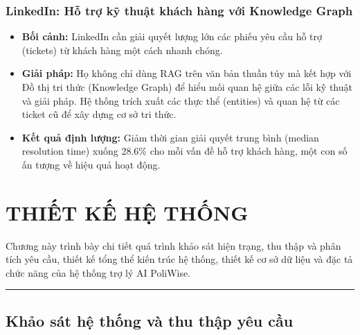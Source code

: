 \documentclass[12pt,a4paper]{report}
\begin{document}
\subsection{LinkedIn: Hỗ trợ kỹ thuật khách hàng với Knowledge Graph}
\begin{itemize}
    \item \textbf{Bối cảnh:} LinkedIn cần giải quyết lượng lớn các phiếu yêu cầu hỗ trợ (tickets) từ khách hàng một cách nhanh chóng.
    \item \textbf{Giải pháp:} Họ không chỉ dùng RAG trên văn bản thuần túy mà kết hợp với Đồ thị tri thức (Knowledge Graph) để hiểu mối quan hệ giữa các lỗi kỹ thuật và giải pháp. Hệ thống trích xuất các thực thể (entities) và quan hệ từ các ticket cũ để xây dựng cơ sở tri thức.
    \item \textbf{Kết quả định lượng:} Giảm thời gian giải quyết trung bình (median resolution time) xuống 28.6\% cho mỗi vấn đề hỗ trợ khách hàng, một con số ấn tượng về hiệu quả hoạt động.
\end{itemize}

\clearpage

\chapter{THIẾT KẾ HỆ THỐNG}



Chương này trình bày chi tiết quá trình khảo sát hiện trạng, thu thập và phân tích yêu cầu, thiết kế tổng thể kiến trúc hệ thống, thiết kế cơ sở dữ liệu và đặc tả chức năng của hệ thống trợ lý AI PoliWise.


\rule{\textwidth}{0.5pt}


\section{Khảo sát hệ thống và thu thập yêu cầu}
\end{document}
